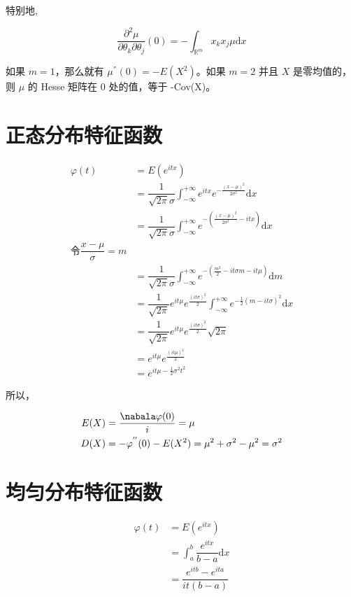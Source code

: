 \documentclass[12pt, a4paper, oneside]{ctexbook}
\begin{document}
特别地,

$$
\dfrac{\partial^{2}\mu}{\partial \theta_k \partial \theta_j}(0) = -\int_{\mathbb{R}^{m}} x_k x_j \mu \mathrm{d} x
$$

如果 $m = 1$，那么就有 $\mu^{''}(0) = -E(X^{2})$。如果 $m = 2$ 并且 $X$ 是零均值的，则 $\mu$ 的 Hesse 矩阵在 0 处的值，等于 -Cov(X)。

\section{正态分布特征函数}
\begin{align*}
\varphi(t) &= E(e^{itx}) \\ &= \dfrac{1}{\sqrt{2\pi} \sigma} \int_{-\infty}^{+\infty} e^{itx} e^{-\frac{(x-\mu)^{2}}{2\sigma^{2}}} \mathrm{d}x \\
&= \dfrac{1}{\sqrt{2\pi} \sigma}\int_{-\infty}^{+\infty} e^{-(\frac{(x-\mu)^{2}}{2\sigma^{2}} - itx)} \mathrm{d}x \\ 
\text{令} \dfrac{x- \mu}{\sigma} = m \\
&= \dfrac{1}{\sqrt{2\pi}\sigma}\int_{-\infty}^{+\infty}e^{-(\frac{m^{2}}{2} - it\sigma m - it\mu)} \mathrm{d}m \\
&= \dfrac{1}{\sqrt{2\pi}}e^{it\mu}e^{\frac{(it\sigma)^{2}}{2}} \int_{-\infty}^{+\infty}e^{-\frac{1}{2}(m - it\sigma)^{2}} \mathrm{d}x \\
&= \dfrac{1}{\sqrt{2\pi}} e^{it\mu} e^{\frac{(it\sigma)^{2}}{2}} \sqrt{2\pi} \\
 &= e^{it\mu} e^{\frac{(it\mu)^{2}}{2}}  \\
 &= e^{it\mu-\frac{1}{2}\sigma^{2}t^{2}}
\end{align*}

所以，

\begin{align*}
    E(X) &= \dfrac{\nabala \varphi(0)}{i} = \mu \\D(X) &= -\varphi^{''}(0) - E(X^{2}) = \mu^{2} + \sigma^{2} - \mu^{2} = \sigma^{2}
\end{align*}


\section{均匀分布特征函数}
\begin{align*}
    \varphi(t) &= E(e^{itx}) \\
    &= \int_a^{b} \dfrac{e^{itx}}{b - a} \mathrm{d}x \\
    &= \dfrac{e^{itb} - e^{ita}}{it(b - a)}
\end{align*}
\end{document}
